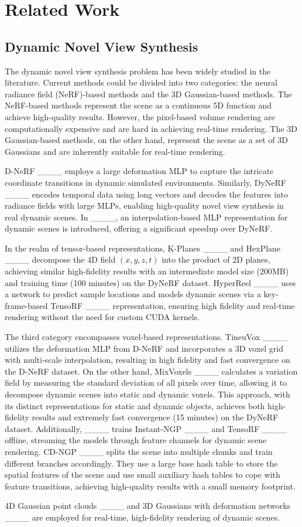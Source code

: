 \section{Related Work}
\subsection{Dynamic Novel View Synthesis}

The dynamic novel view synthesis problem has been widely studied in the literature. Current methods could be divided into two categories: the neural radiance field (NeRF)-based methods and the 3D Gaussian-based methods. The NeRF-based methods represent the scene as a continuous 5D function and achieve high-quality results. However, the pixel-based volume rendering are computationally expensive and are hard in achieving real-time rendering. 
The 3D Gaussian-based methods, on the other hand, represent the scene as a set of 3D Gaussians and are inherently suitable for real-time rendering. 

D-NeRF ____ employs a large deformation MLP to capture the intricate coordinate transitions in dynamic simulated environments. Similarly, DyNeRF ____ encodes temporal data using long vectors and decodes the features into radiance fields with large MLPs, enabling high-quality novel view synthesis in real dynamic scenes. In ____, an interpolation-based MLP representation for dynamic scenes is introduced, offering a significant speedup over DyNeRF. 

In the realm of tensor-based representations,  K-Planes ____ and HexPlane ____ decompose the 4D field $(x,y,z,t)$ into the product of 2D planes, achieving similar high-fidelity results with an intermediate model size (200MB) and training time (100 minutes) on the DyNeRF dataset.  HyperReel ____ uses a network to predict sample locations and models dynamic scenes via a key-frame-based TensoRF ____ representation, ensuring high fidelity and real-time rendering without the need for custom CUDA kernels. 


The third category encompasses  voxel-based representations. TineuVox ____ utilizes the deformation MLP from D-NeRF and incorporates a 3D voxel grid with multi-scale interpolation, resulting in high fidelity and fast convergence on the D-NeRF dataset. On the other hand, MixVoxels ____ calculates a variation field by measuring the standard deviation of all pixels over time, allowing it to decompose dynamic scenes into static and dynamic voxels. This approach, with its distinct representations for static and dynamic objects, achieves both high-fidelity results and extremely fast convergence (15 minutes) on the DyNeRF dataset. Additionally, ____ trains Instant-NGP ____ and TensoRF ____ offline, streaming the models through feature channels for dynamic scene rendering. CD-NGP ____ splits the scene into multiple chunks and train different branches accordingly. They use a large base hash table to store the spatial features of the scene and use small auxiliary hash tables to cope with feature transitions, achieving high-quality results with a small memory footprint. 


4D Gaussian point clouds ____ and 3D Gaussians with deformation networks ____ are employed for real-time, high-fidelity rendering of dynamic scenes.